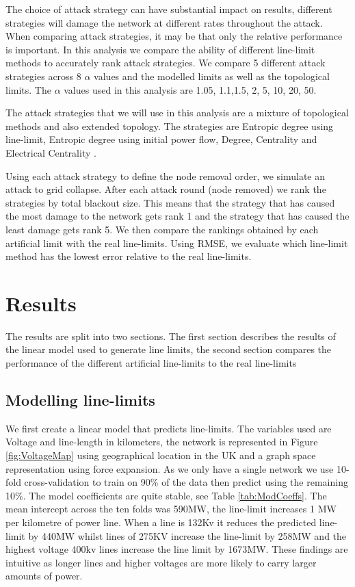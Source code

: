 \documentclass{article}
\begin{document}
The choice of attack strategy can have substantial impact on results, different strategies will damage the network at different rates throughout the attack. When comparing attack strategies, it may be that only the relative performance is important. In this analysis we compare the ability of different line-limit methods to accurately rank attack strategies. We compare 5 different attack strategies across 8 $\alpha$ values and the modelled limits as well as the topological limits. The $\alpha$ values used in this analysis are 1.05, 1.1,1.5, 2, 5,  10, 20, 50.

The attack strategies that we will use in this analysis are a mixture of topological methods and also extended topology. The strategies are Entropic degree \cite{Bompard2009} using line-limit, Entropic degree \cite{Bompard2009} using initial power flow, Degree, Centrality and Electrical Centrality \cite{Wang2011}.

Using each attack strategy to define the node removal order, we simulate an attack to grid collapse. After each attack round (node removed) we rank the strategies by total blackout size. This means that the strategy that has caused the most damage to the network gets rank 1 and the strategy that has caused the least damage gets rank 5. We then compare the rankings obtained by each artificial limit with the real line-limits. Using RMSE, we evaluate which line-limit method has the lowest error relative to the real line-limits.

\section{Results}
The results are split into two sections. The first section describes the results of the linear model used to generate line limits, the second section compares the performance of the different artificial line-limits to the real line-limits

\subsection{Modelling line-limits}
We first create a linear model that predicts line-limits. The variables used are Voltage and line-length in kilometers, the network is represented in Figure \ref{fig:VoltageMap} using geographical location in the UK and a graph space representation using force expansion.  As we only have a single network we use 10-fold cross-validation to train on 90\% of the data then predict using the remaining 10\%. The model coefficients are quite stable, see Table \ref{tab:ModCoeffs}. The mean intercept across the ten folds was 590MW,  the line-limit increases 1 MW per kilometre of power line. When a line is 132Kv it reduces the predicted line-limit by 440MW whilst lines of 275KV increase the line-limit by 258MW and the highest voltage 400kv lines increase the line limit by 1673MW. These findings are intuitive as longer lines and higher voltages are more likely to carry larger amounts of power.
\end{document}
